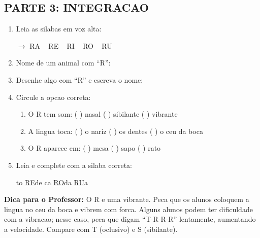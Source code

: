 \begin{exercicio}
\subsection*{PARTE 3: INTEGRACAO}

\begin{enumerate}[resume]
  \item Leia as silabas em voz alta:
  \begin{center}
  $\rightarrow$ RA  ~  RE  ~  RI  ~  RO  ~  RU
  \end{center}

  \item Nome de um animal com ``R'':
  \begin{center}
  \underline{\hspace{6cm}}
  \end{center}

  \item Desenhe algo com ``R'' e escreva o nome:
  \begin{center}
  \end{center}

  \item Circule a opcao correta:
  \begin{enumerate}[label=(\alph*)]
    \item O R tem som: ( ) nasal ( ) sibilante ( ) vibrante
    \item A lingua toca: ( ) o nariz ( ) os dentes ( ) o ceu da boca
    \item O R aparece em: ( ) mesa ( ) sapo ( ) rato
  \end{enumerate}

  \item Leia e complete com a silaba correta:
  \begin{center}
  to \quad \underline{RE}de \quad {}ca \quad \underline{RO}da \quad \underline{RU}a
  \end{center}
\end{enumerate}
\end{exercicio}

\begin{dica}
\textbf{Dica para o Professor:} O R e uma vibrante. Peca que os alunos coloquem a lingua no ceu da boca e vibrem com forca. Alguns alunos podem ter dificuldade com a vibracao; nesse caso, peca que digam ``T-R-R-R'' lentamente, aumentando a velocidade. Compare com T (oclusivo) e S (sibilante).
\end{dica}

